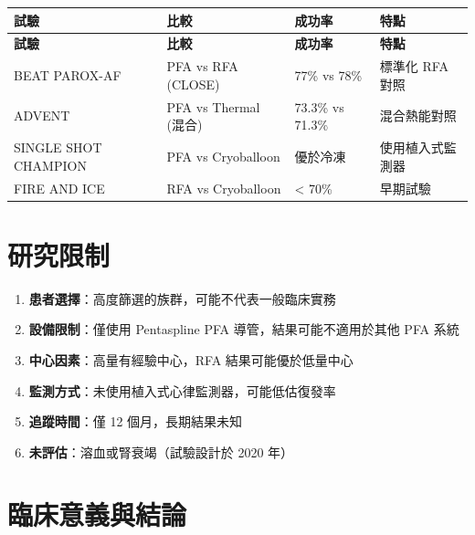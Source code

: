 \documentclass[12pt,a4paper]{article}
\begin{document}
\begin{longtable}{p{3.5cm}p{3cm}p{3cm}p{4cm}}
\toprule
\textbf{試驗} & \textbf{比較} & \textbf{成功率} & \textbf{特點} \\
\midrule
\endfirsthead
\midrule
\textbf{試驗} & \textbf{比較} & \textbf{成功率} & \textbf{特點} \\
\midrule
\endhead
\bottomrule
\endfoot
BEAT PAROX-AF & PFA vs RFA (CLOSE) & 77\% vs 78\% & 標準化 RFA 對照 \\
\midrule
ADVENT & PFA vs Thermal (混合) & 73.3\% vs 71.3\% & 混合熱能對照 \\
\midrule
SINGLE SHOT CHAMPION & PFA vs Cryoballoon & 優於冷凍 & 使用植入式監測器 \\
\midrule
FIRE AND ICE & RFA vs Cryoballoon & < 70\% & 早期試驗 \\
\bottomrule
\end{longtable}

\section{研究限制}

\begin{enumerate}
    \item \textbf{患者選擇}：高度篩選的族群，可能不代表一般臨床實務
    \item \textbf{設備限制}：僅使用 Pentaspline PFA 導管，結果可能不適用於其他 PFA 系統
    \item \textbf{中心因素}：高量有經驗中心，RFA 結果可能優於低量中心
    \item \textbf{監測方式}：未使用植入式心律監測器，可能低估復發率
    \item \textbf{追蹤時間}：僅 12 個月，長期結果未知
    \item \textbf{未評估}：溶血或腎衰竭（試驗設計於 2020 年）
\end{enumerate}

\section{臨床意義與結論}
\end{document}
